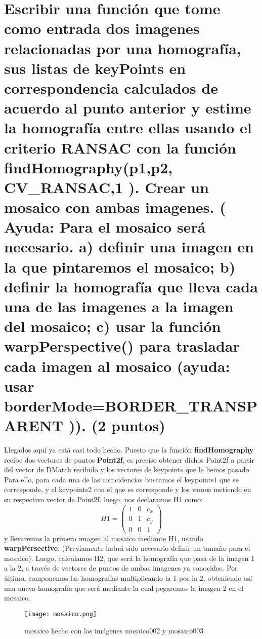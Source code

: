 \section{Escribir una función que tome como entrada dos imagenes relacionadas por
una homografía, sus listas de keyPoints en correspondencia calculados de
acuerdo al punto anterior y estime la homografía entre ellas usando el criterio
RANSAC con la función findHomography(p1,p2, CV\_RANSAC,1 ). Crear un
mosaico con ambas imagenes. ( Ayuda: Para el mosaico será necesario. a)
definir una imagen en la que pintaremos el mosaico; b) definir la homografía
que lleva cada una de las imagenes a la imagen del mosaico; c) usar la función
warpPerspective() para trasladar cada imagen al mosaico (ayuda: usar
borderMode=BORDER\_TRANSPARENT )). (2 puntos)}
Llegados aquí ya está casi todo hecho. Puesto que la función \textbf{findHomography} recibe dos vectores
de puntos \textbf{Point2f}, es preciso obtener dichos Point2f a partir del vector de DMatch recibido y los vectores
de keypoints que le hemos pasado. Para ello, para cada una de las coincidencias buscamos el keypoints1 que se
corresponde, y el keypoints2 con el que se corresponde y los vamos metiendo en su respectivo vector de Point2f. \newline
luego, nos declaramos H1 como:
\[H1=\begin{pmatrix} 1& 0 &c_{x} \\ 0& 1& c_{y}\\ 0& 0& 1 \end{pmatrix}\]
y llevaremos la primera imagen al mosaico mediante H1, usando \textbf{warpPersective}. (Previamente habrá sido necesario definir
un tamaño para el mosaico). Luego, calculamos H2, que será la homografía que pasa de la imagen 1 a la 2, a través
de vectores de puntos de ambas imagenes ya conocidos. \newline
Por último, componemos las homografías multiplicando la 1 por la 2, obteniendo así una nueva homografía que será mediante la cual
pegaremos la imagen 2 en el mosaico.
\begin{figure}[H] %
\centering
\texttt{[image: mosaico.png]}  %
\label{figura1}
\caption{mosaico hecho con las imágenes mosaico002 y mosaico003}
\end{figure}



